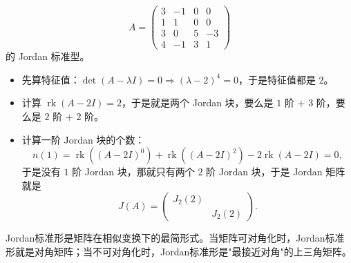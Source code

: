 \begin{example}
\[
A = \begin{pmatrix}
3 & -1 & 0 & 0 \\
1 & 1 & 0 & 0 \\
3 & 0 & 5 & -3 \\
4 & -1 & 3 & 1
\end{pmatrix}
\]
的 Jordan 标准型。

\begin{itemize}
    \item 先算特征值：$\det(A - \lambda I) = 0 \Rightarrow (\lambda - 2)^4 = 0$，于是特征值都是 $2$。
    \item 计算 $\operatorname{rk}(A - 2I) = 2$，于是就是两个 Jordan 块，要么是 $1$ 阶 $+$ $3$ 阶，要么是 $2$ 阶 $+$ $2$ 阶。
    \item 计算一阶 Jordan 块的个数：
    \[
    n(1) = \operatorname{rk}\left((A-2I)^0\right) + \operatorname{rk}\left((A-2I)^2\right) - 2\operatorname{rk}(A-2I) = 0,
    \]
    于是没有 $1$ 阶 Jordan 块，那就只有两个 $2$ 阶 Jordan 块，于是 Jordan 矩阵就是
    \[
    J(A) = \begin{pmatrix}
    J_2(2) & \\
    & J_2(2)
    \end{pmatrix}.
    \]
\end{itemize}
\end{example}

\begin{remark}
Jordan标准形是矩阵在相似变换下的最简形式。当矩阵可对角化时，Jordan标准形就是对角矩阵；当不可对角化时，Jordan标准形是"最接近对角"的上三角矩阵。
\end{remark}
